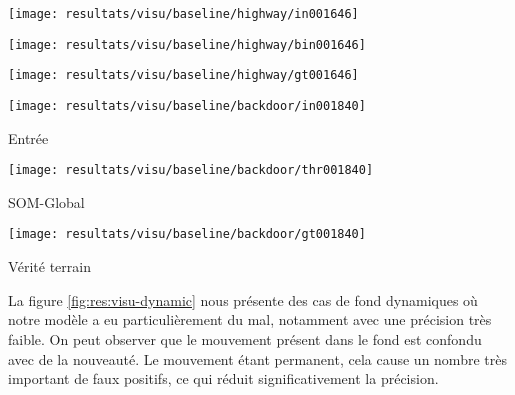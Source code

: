 	\begin{figureth}
		\begin{subfigureth}{.32\textwidth}
			\texttt{[image: resultats/visu/baseline/highway/in001646]}
		\end{subfigureth}
		\begin{subfigureth}{.32\textwidth}
			\texttt{[image: resultats/visu/baseline/highway/bin001646]}
		\end{subfigureth}
		\begin{subfigureth}{.32\textwidth}
			\texttt{[image: resultats/visu/baseline/highway/gt001646]}
		\end{subfigureth}

		\begin{subfigureth}{.32\textwidth}
			\texttt{[image: resultats/visu/baseline/backdoor/in001840]} \caption{Entrée}
		\end{subfigureth}
		\begin{subfigureth}{.32\textwidth}
			\texttt{[image: resultats/visu/baseline/backdoor/thr001840]} \caption{SOM-Global}
		\end{subfigureth}
		\begin{subfigureth}{.32\textwidth}
			\texttt{[image: resultats/visu/baseline/backdoor/gt001840]} \caption{Vérité terrain}
		\end{subfigureth}

		\caption[]{}\label{fig:res:visu-baseline}
	\end{figureth}

	La figure \ref{fig:res:visu-dynamic} nous présente des cas de fond dynamiques où notre modèle a eu particulièrement du mal, notamment avec une précision très faible. On peut observer que le mouvement présent dans le fond est confondu avec de la nouveauté. Le mouvement étant permanent, cela cause un nombre très important de faux positifs, ce qui réduit significativement la précision.  

